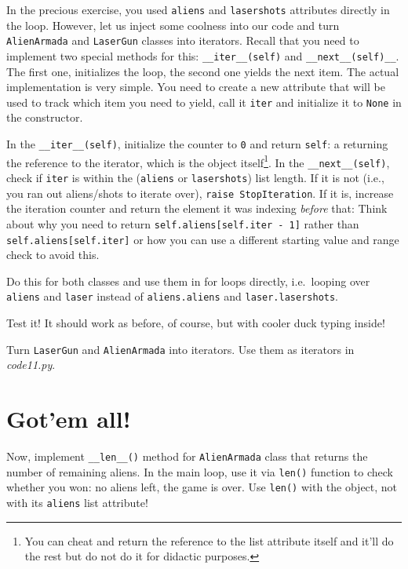 \documentclass[
]{book}
\begin{document}
In the precious exercise, you used \texttt{aliens} and \texttt{lasershots} attributes directly in the loop. However, let us inject some coolness into our code and turn \texttt{AlienArmada} and \texttt{LaserGun} classes into iterators. Recall that you need to implement two special methods for this: \texttt{\_\_iter\_\_(self)} and \texttt{\_\_next\_\_(self)\_\_}. The first one, initializes the loop, the second one yields the next item. The actual implementation is very simple. You need to create a new attribute that will be used to track which item you need to yield, call it \texttt{iter} and initialize it to \texttt{None} in the constructor.

In the \texttt{\_\_iter\_\_(self)}, initialize the counter to \texttt{0} and return \texttt{self}: a returning the reference to the iterator, which is the object itself\footnote{You can cheat and return the reference to the list attribute itself and it'll do the rest but do not do it for didactic purposes.}. In the \texttt{\_\_next\_\_(self)}, check if \texttt{iter} is within the (\texttt{aliens} or \texttt{lasershots}) list length. If it is not (i.e., you ran out aliens/shots to iterate over), \texttt{raise\ StopIteration}. If it is, increase the iteration counter and return the element it was indexing \emph{before} that: Think about why you need to return \texttt{self.aliens{[}self.iter\ -\ 1{]}} rather than \texttt{self.aliens{[}self.iter{]}} or how you can use a different starting value and range check to avoid this.

Do this for both classes and use them in for loops directly, i.e.~looping over \texttt{aliens} and \texttt{laser} instead of \texttt{aliens.aliens} and \texttt{laser.lasershots}.

Test it! It should work as before, of course, but with cooler duck typing inside!

Turn \texttt{LaserGun} and \texttt{AlienArmada} into iterators.
Use them as iterators in \emph{code11.py}.

\hypertarget{gotem-all}{%
\section{Got'em all!}\label{gotem-all}}

Now, implement \texttt{\_\_len\_\_()} method for \texttt{AlienArmada} class that returns the number of remaining aliens. In the main loop, use it via \texttt{len()} function to check whether you won: no aliens left, the game is over. Use \texttt{len()} with the object, not with its \texttt{aliens} list attribute!
\end{document}
